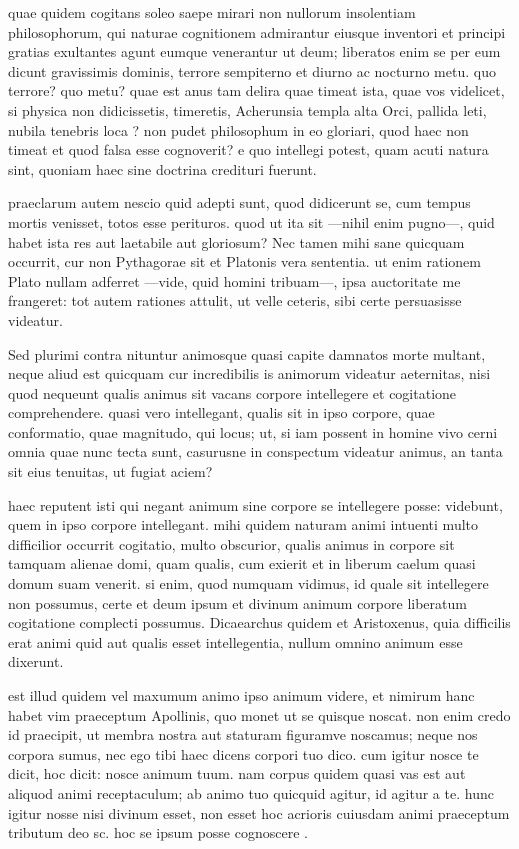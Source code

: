  quae quidem cogitans soleo saepe mirari non nullorum insolentiam philosophorum, qui naturae cognitionem admirantur eiusque inventori et principi gratias exultantes agunt eumque venerantur ut deum; liberatos enim se per eum dicunt gravissimis dominis, terrore sempiterno et diurno ac nocturno metu. quo terrore? quo metu? quae est anus tam delira quae timeat ista, quae vos videlicet, si physica non didicissetis, timeretis, Acherunsia templa alta Orci, pallida leti, nubila tenebris loca ? non pudet philosophum in eo gloriari, quod haec non timeat et quod falsa esse cognoverit? e quo intellegi potest, quam acuti natura sint, quoniam haec sine doctrina credituri fuerunt.

 praeclarum autem nescio quid adepti sunt, quod didicerunt se, cum tempus mortis venisset, totos esse perituros. quod ut ita sit —nihil enim pugno—, quid habet ista res aut laetabile aut gloriosum? Nec tamen mihi sane quicquam occurrit, cur non Pythagorae sit et Platonis vera sententia. ut enim rationem Plato nullam adferret —vide, quid homini tribuam—, ipsa auctoritate me frangeret: tot autem rationes attulit, ut velle ceteris, sibi certe persuasisse videatur.

 Sed plurimi contra nituntur animosque quasi capite damnatos morte multant, neque aliud est quicquam cur incredibilis is animorum videatur aeternitas, nisi quod nequeunt qualis animus sit vacans corpore intellegere et cogitatione comprehendere. quasi vero intellegant, qualis sit in ipso corpore, quae conformatio, quae magnitudo, qui locus; ut, si iam possent in homine vivo cerni omnia quae nunc tecta sunt, casurusne in conspectum videatur animus, an tanta sit eius tenuitas, ut fugiat aciem?

 haec reputent isti qui negant animum sine corpore se intellegere posse: videbunt, quem in ipso corpore intellegant. mihi quidem naturam animi intuenti multo difficilior occurrit cogitatio, multo obscurior, qualis animus in corpore sit tamquam alienae domi, quam qualis, cum exierit et in liberum caelum quasi domum suam venerit. si enim, quod numquam vidimus, id quale sit intellegere non possumus, certe et deum ipsum et divinum animum corpore liberatum cogitatione complecti possumus. Dicaearchus quidem et Aristoxenus, quia difficilis erat animi quid aut qualis esset intellegentia, nullum omnino animum esse dixerunt.

 est illud quidem vel maxumum animo ipso animum videre, et nimirum hanc habet vim praeceptum Apollinis, quo monet ut se quisque noscat. non enim credo id praecipit, ut membra nostra aut staturam figuramve noscamus; neque nos corpora sumus, nec ego tibi haec dicens corpori tuo dico. cum igitur nosce te dicit, hoc dicit: nosce animum tuum. nam corpus quidem quasi vas est aut aliquod animi receptaculum; ab animo tuo quicquid agitur, id agitur a te. hunc igitur nosse nisi divinum esset, non esset hoc acrioris cuiusdam animi praeceptum tributum deo sc. hoc se ipsum posse cognoscere .

